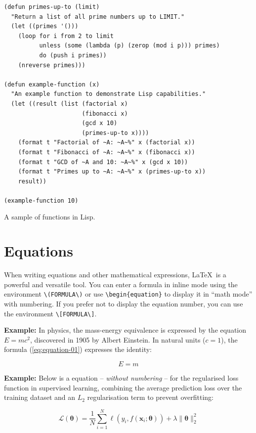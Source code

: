 {\begin{longlisting}
\begin{verbatim}
(defun primes-up-to (limit)
  "Return a list of all prime numbers up to LIMIT."
  (let ((primes '()))
    (loop for i from 2 to limit
          unless (some (lambda (p) (zerop (mod i p))) primes)
          do (push i primes))
    (nreverse primes)))

(defun example-function (x)
  "An example function to demonstrate Lisp capabilities."
  (let ((result (list (factorial x)
                      (fibonacci x)
                      (gcd x 10)
                      (primes-up-to x))))
    (format t "Factorial of ~A: ~A~%" x (factorial x))
    (format t "Fibonacci of ~A: ~A~%" x (fibonacci x))
    (format t "GCD of ~A and 10: ~A~%" x (gcd x 10))
    (format t "Primes up to ~A: ~A~%" x (primes-up-to x))
    result))

(example-function 10)
\end{verbatim}
\caption{A sample of functions in Lisp.}
\label{listing:lisp-code}
\end{longlisting}

\section{Equations}
When writing equations and other mathematical expressions, \LaTeX~is a powerful and versatile tool. You can enter a formula in inline mode using the environment \verb|\(FORMULA\)| or use \verb|\begin{equation}| to display it in ``math mode'' with numbering. If you prefer not to display the equation number, you can use the environment \verb|\[FORMULA\]|.

\vspace{.875em}
\textbf{Example:} In physics, the mass-energy equivalence is expressed by the equation \(E=mc^2\), discovered in 1905 by Albert Einstein. In natural units ($c = 1$), the formula (\ref{eq:equation-01}) expresses the identity:

\begin{equation}
\label{eq:equation-01}
E=m
\end{equation}

\textbf{Example:} Below is a equation -- \textit{without numbering} -- for the regularised loss function in supervised learning, combining the average prediction loss over the training dataset and an $L_2$ regularisation term to prevent overfitting:

\[
\mathcal{L}(\boldsymbol{\theta}) = \frac{1}{N} \sum_{i=1}^{N} \ell(y_i, f(\mathbf{x}_i; \boldsymbol{\theta})) + \lambda \|\boldsymbol{\theta}\|_2^2
\]

}
